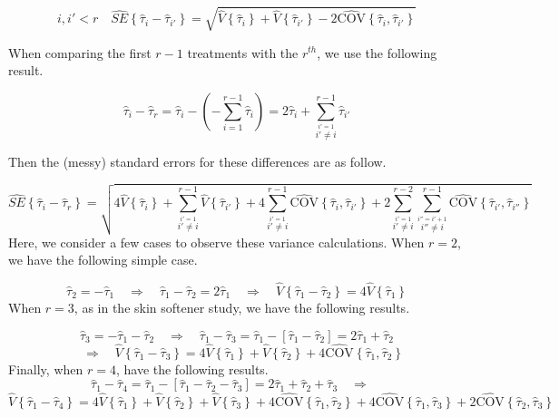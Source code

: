 \documentclass[
]{book}
\begin{document}
\[
i,i' < r  \quad
\hat{SE}\left\{\hat{\tau}_i-\hat{\tau}_{i'}\right\} =
\sqrt{\hat{V}\left\{\hat{\tau}_i\right\}+\hat{V}\left\{\hat{\tau}_{i'}\right\}
-2\hat{\mbox{COV}}\left\{\hat{\tau}_i,\hat{\tau}_{i'}\right\}}
\]

When comparing the first \(r-1\) treatments with the \(r^{th}\), we use
the following result.

\[
\hat{\tau}_i-\hat{\tau}_r=\hat{\tau}_i-\left(-\sum_{i=1}^{r-1}\hat{\tau}_i\right)=
2\hat{\tau}_i + \sum_{\stackrel{i'=1}{i'\ne i}}^{r-1}\hat{\tau}_{i'}
\]

Then the (messy) standard errors for these differences are as follow.

\[
\hat{SE}\left\{\hat{\tau}_i-\hat{\tau}_r\right\} =
\sqrt{4\hat{V}\left\{\hat{\tau}_i\right\} +
\sum_{\stackrel{i'=1}{i'\ne i}}^{r-1}\hat{V}\left\{\hat{\tau}_{i'}\right\}
+4\sum_{\stackrel{i'=1}{i'\ne i}}^{r-1}\hat{\mbox{COV}}\left\{\hat{\tau}_i,\hat{\tau}_{i'}\right\}
+2\sum_{\stackrel{i'=1}{i'\ne i}}^{r-2}\sum_{\stackrel{i''=i'+1}{i''\ne i}}^{r-1}
\hat{\mbox{COV}}\left\{\hat{\tau}_{i'},\hat{\tau}_{i''}\right\}
}
\] Here, we consider a few cases to observe these variance calculations.
When \(r=2\), we have the following simple case.

\[
\hat{\tau}_2 = -\hat{\tau}_1 \quad \Rightarrow \quad 
\hat{\tau}_1-\hat{\tau}_2=
2\hat{\tau}_1 
\quad \Rightarrow \quad 
\hat{V}\left\{\hat{\tau}_1-\hat{\tau}_2\right\}
=4\hat{V}\left\{\hat{\tau}_1\right\}
\] When \(r=3\), as in the skin softener study, we have the following
results.

\[
\hat{\tau}_3 = -\hat{\tau}_1-\hat{\tau}_2 \quad \Rightarrow \quad
\hat{\tau}_1-\hat{\tau}_3 = \hat{\tau}_1-\left[\hat{\tau}_1-\hat{\tau}_2\right]=
2\hat{\tau}_1+\hat{\tau}_2 
\] \[\quad \Rightarrow \quad
\hat{V}\left\{\hat{\tau}_1-\hat{\tau}_3\right\}=
4\hat{V}\left\{\hat{\tau}_1\right\}+\hat{V}\left\{\hat{\tau}_2\right\}+
4\hat{\mbox{COV}}\left\{\hat{\tau}_1,\hat{\tau}_2\right\}
\] Finally, when \(r=4\), have the following results. \[
\hat{\tau}_1-\hat{\tau}_4 = 
\hat{\tau}_1-\left[\hat{\tau}_1-\hat{\tau}_2-\hat{\tau}_3\right]=
2\hat{\tau}_1+\hat{\tau}_2+\hat{\tau}_3 \quad \Rightarrow \quad  
\] \[
\hat{V}\left\{\hat{\tau}_1-\hat{\tau}_4\right\}=
4\hat{V}\left\{\hat{\tau}_1\right\}+\hat{V}\left\{\hat{\tau}_2\right\}+
\hat{V}\left\{\hat{\tau}_3\right\}+
4\hat{\mbox{COV}}\left\{\hat{\tau}_1,\hat{\tau}_2\right\}+
4\hat{\mbox{COV}}\left\{\hat{\tau}_1,\hat{\tau}_3\right\}+
2\hat{\mbox{COV}}\left\{\hat{\tau}_2,\hat{\tau}_3\right\}
\]
\end{document}
